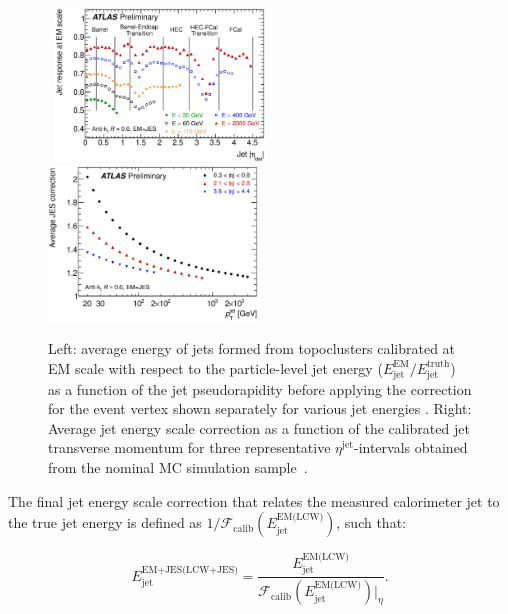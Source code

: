 \begin{figure}[!ht]
  \begin{center}
    \mbox{
      \includegraphics[width=0.495\textwidth]{ObjectReconstruction/Figures/JetCalibrationResponse.eps}
      \includegraphics[width=0.495\textwidth]{ObjectReconstruction/Figures/JetCalibfig_EMJES_vs_pT_AntiKt6.eps}
    }
  \end{center}
  \caption[Average energy of jets formed from topoclusters calibrated at EM scale, and average jet energy scale correction as a function of the calibrated jet transverse momentum.]{Left: average energy of jets formed from topoclusters calibrated at EM scale with respect to the particle-level jet energy ($E_{\text{jet}}^{\text{EM}}/E_{\text{jet}}^{\text{truth}}$) as a function of the jet pseudorapidity before applying the correction for the event vertex shown separately for various jet energies \protect\cite{Aad:2011he}.
  Right: Average jet energy scale correction as a function of the calibrated jet transverse momentum for three representative $\eta^{\text{jet}}$-intervals obtained from the nominal MC simulation sample~\protect\cite{Aad:2011he}.
  }
  \label{fig:JetCalibrationResponse}
\end{figure}

The final jet energy scale correction that relates the measured calorimeter jet to the true jet energy is defined as $1/\mathcal{F}_{\text{calib}}(E_{\text{jet}}^{\text{EM(LCW)}})$, such that:

\begin{equation}
E_{\text{jet}}^{\text{EM+JES(LCW+JES)}} = \frac{E_{\text{jet}}^{\text{EM(LCW)}}}{\mathcal{F}_{\text{calib}}(E_{\text{jet}}^{\text{EM(LCW)}})|_{\eta}}.
\label{eq:JetJESCorrection}
\end{equation}

